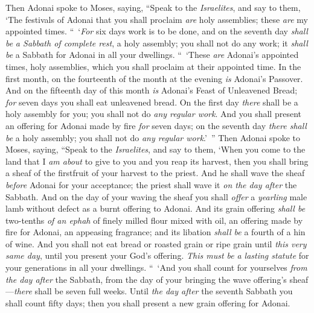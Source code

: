 \begin{biblechapter} %
 Then Adonai spoke to Moses, saying,
\verse “Speak to the \textit{Israelites}, and say to them, ‘The festivals of Adonai that you shall proclaim \textit{are} holy assemblies; these \textit{are} my appointed times.
 “ ‘\textit{For} six days work is to be done, and on the seventh day \textit{shall be} \textit{a Sabbath of complete rest}, a holy assembly; you shall not do any work; it \textit{shall be} a Sabbath for Adonai in all your dwellings.
 “ ‘These \textit{are} Adonai’s appointed times, holy assemblies, which you shall proclaim at their appointed time.
\verse In the first month, on the fourteenth of the month at the evening \textit{is} Adonai’s Passover.
\verse And on the fifteenth day of this month \textit{is} Adonai’s Feast of Unleavened Bread; \textit{for} seven days you shall eat unleavened bread.
\verse On the first day \textit{there} shall be a holy assembly for you; you shall not do \textit{any regular work}.
\verse And you shall present an offering for Adonai made by fire \textit{for} seven days; on the seventh day \textit{there shall be} a holy assembly; you shall not do \textit{any regular work}.’ ”
 Then Adonai spoke to Moses, saying,
\verse “Speak to the \textit{Israelites}, and say to them, ‘When you come to the land that I \textit{am about} to give to you and you reap its harvest, then you shall bring a sheaf of the firstfruit of your harvest to the priest.
\verse And he shall wave the sheaf \textit{before} Adonai for your acceptance; the priest shall wave it \textit{on the day after} the Sabbath.
\verse And on the day of your waving the sheaf you shall \textit{offer} a \textit{yearling} male lamb without defect as a burnt offering to Adonai.
\verse And its grain offering \textit{shall be} two-tenths \textit{of an ephah} of finely milled flour mixed with oil, an offering made by fire for Adonai, an appeasing fragrance; and its libation \textit{shall be} a fourth of a hin of wine.
\verse And you shall not eat bread or roasted grain or ripe grain until \textit{this very same day}, until you present your God’s offering. \textit{This must be} \textit{a lasting statute} for your generations in all your dwellings.
 “ ‘And you shall count for yourselves \textit{from the day after} the Sabbath, from the day of your bringing the wave offering’s sheaf—\textit{there} shall be seven full weeks.
\verse Until \textit{the day after} the seventh Sabbath you shall count fifty days; then you shall present a new grain offering for Adonai.

\end{biblechapter}
